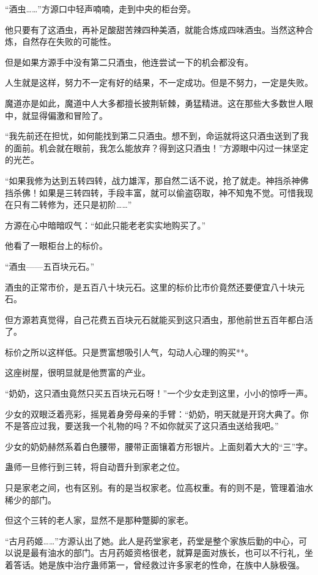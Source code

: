 
\begin{this_body}

“酒虫……”方源口中轻声喃喃，走到中央的柜台旁。

他只要有了这酒虫，再补足酸甜苦辣四种美酒，就能合炼成四味酒虫。当然这种合炼，自然存在失败的可能性。

但是如果方源手中没有第二只酒虫，他连尝试一下的机会都没有。

人生就是这样，努力不一定有好的结果，不一定成功。但是不努力，一定是失败。

魔道亦是如此，魔道中人大多都擅长披荆斩棘，勇猛精进。这在那些大多数世人眼中，就显得偏激和冒险了。

“我先前还在担忧，如何能找到第二只酒虫。想不到，命运就将这只酒虫送到了我的面前。机会就在眼前，我怎么能放弃？得到这只酒虫！”方源眼中闪过一抹坚定的光芒。

“如果我修为达到五转四转，战力雄浑，那自然二话不说，抢了就走。神挡杀神佛挡杀佛！如果是三转四转，手段丰富，就可以偷盗窃取，神不知鬼不觉。可惜我现在只有二转修为，还只是初阶……”

方源在心中暗暗叹气：“如此只能老老实实地购买了。”

他看了一眼柜台上的标价。

“酒虫——五百块元石。”

酒虫的正常市价，是五百八十块元石。这里的标价比市价竟然还要便宜八十块元石。

但方源若真觉得，自己花费五百块元石就能买到这只酒虫，那他前世五百年都白活了。

标价之所以这样低。只是贾富想吸引人气，勾动人心理的购买**。

这座树屋，很明显就是他贾富的产业。

“奶奶，这只酒虫竟然只买五百块元石呀！”一个少女走到这里，小小的惊呼一声。

少女的双眼泛着亮彩，摇晃着身旁母亲的手臂：“奶奶，明天就是开窍大典了。你不是答应过我，要送我一个礼物的吗？不如你就买了这只酒虫送给我吧。”

少女的奶奶赫然系着白色腰带，腰带正面镶着方形银片。上面刻着大大的“三”字。

蛊师一旦修行到三转，将自动晋升到家老之位。

只是家老之间，也有区别。有的是当权家老。位高权重。有的则不是，管理着油水稀少的部门。

但这个三转的老人家，显然不是那种蹩脚的家老。

“古月药姬……”方源认出了她。此人是药堂家老，药堂是整个家族后勤的中心，可以说是最有油水的部门。古月药姬资格很老，就算是面对族长，也可以不行礼，坐着答话。她是族中治疗蛊师第一，曾经救过许多家老的性命，在族中人脉极强。


\end{this_body}
